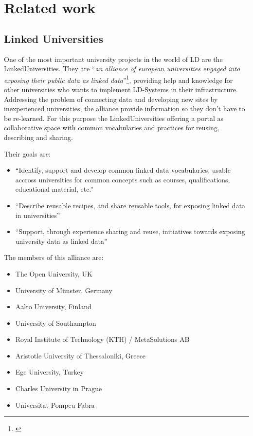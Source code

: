 \section{Related work}
\subsection{Linked Universities}\label{linkeduniversities}
One of the most important university projects in the world of LD are the LinkedUniversities. They are "`\textit{an alliance of european universities engaged into exposing their public data as linked data}"'\footnote{\cite{url:linkeduniversities}}, providing help and knowledge for other universities who wants to implement LD-Systems in their infrastructure. Addressing the problem of connecting data and developing new sites by inexperienced universities, the alliance provide information so they don't have to be re-learned. For this purpose the LinkedUniversities offering a portal as collaborative space with common vocabularies and practices for reusing, describing and sharing.

Their goals are:\cite{url:linkeduniversities}

\begin{itemize}
\item "`Identify, support and develop common linked data vocabularies, usable accross universities for common concepts such as courses, qualifications, educational material, etc."'
\item "`Describe reusable recipes, and share reusable tools, for exposing linked data in universities"'
\item "`Support, through experience sharing and reuse, initiatives towards exposing university data as linked data"'
\end{itemize}


The members of this alliance are:\cite{url:linked-universities-members}
\begin{itemize}
	\item The Open University, UK
	\item University of Münster, Germany
	\item Aalto University, Finland
	\item University of Southampton
	\item Royal Institute of Technology (KTH) / MetaSolutions AB
	\item Aristotle University of Thessaloniki, Greece
	\item Ege University, Turkey
	\item Charles University in Prague
	\item Universitat Pompeu Fabra
\end{itemize}

